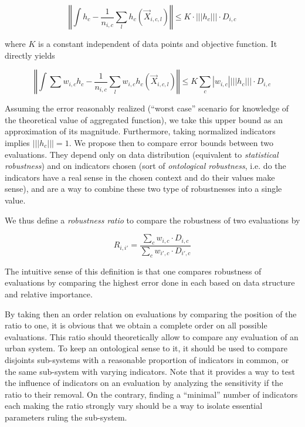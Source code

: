 \documentclass[runningheads,a4paper]{llncs2e/llncs}
\begin{document}
\[
\left\Vert \int h_{c}-\frac{1}{n_{i,c}}\sum_{l}h_{c}(\vec{X}_{i,c,l})\right\Vert \leq K\cdot\left|\left|\left|h_{c}\right|\right|\right|\cdot D_{i,c}
\]

where $K$ is a constant independent of data points and objective function. It directly yields

\[
\left\Vert \int\sum w_{i,c}h_{c}-\frac{1}{n_{i,c}}\sum_{l}w_{i,c}h_{c}(\vec{X}_{i,c,l})\right\Vert \leq K\sum_{c}\left|w_{i,c}\right|\left|\left|\left|h_{c}\right|\right|\right|\cdot D_{i,c}
\]

Assuming the error reasonably realized (``worst case'' scenario for knowledge of the theoretical value of aggregated function), we take this upper bound as an approximation of its magnitude. Furthermore, taking normalized indicators implies $\left|\left|\left|h_c\right|\right|\right| = 1$. We propose then to compare error bounds between two evaluations. They depend only on data distribution (equivalent to \emph{statistical robustness}) and on indicators chosen (sort of \emph{ontological robustness}, i.e. do the indicators have a real sense in the chosen context and do their values make sense), and are a way to combine these two type of robustnesses into a single value.

We thus define a \emph{robustness ratio} to compare the robustness of two evaluations by

\begin{equation}
R_{i,i'}=\frac{\sum_{c}w_{i,c}\cdot D_{i,c}}{\sum_{c}w_{i',c}\cdot D_{i',c}}
\end{equation}


The intuitive sense of this definition is that one compares robustness of evaluations by comparing the highest error done in each based on data structure and relative importance.


By taking then an order relation on evaluations by comparing the position of the ratio to one, it is obvious that we obtain a complete order on all possible evaluations. This ratio should theoretically allow to compare any evaluation of an urban system. To keep an ontological sense to it, it should be used to compare disjoints sub-systems with a reasonable proportion of indicators in common, or the same sub-system with varying indicators. Note that it provides a way to test the influence of indicators on an evaluation by analyzing the sensitivity if the ratio to their removal. On the contrary, finding a ``minimal'' number of indicators each making the ratio strongly vary should be a way to isolate essential parameters ruling the sub-system.
\end{document}
